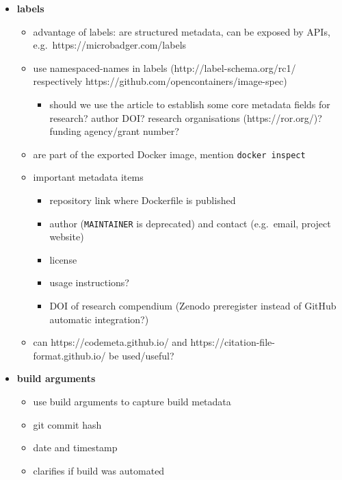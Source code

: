 \documentclass[10pt,letterpaper]{article}
\providecommand{\tightlist}{%
  \setlength{\itemsep}{0pt}\setlength{\parskip}{0pt}}
\begin{document}
\begin{itemize}
\tightlist
\item
  \textbf{labels}

  \begin{itemize}
  \tightlist
  \item
    advantage of labels: are structured metadata, can be exposed by
    APIs, e.g.~https://microbadger.com/labels
  \item
    use namespaced-names in labels (http://label-schema.org/rc1/
    respectively https://github.com/opencontainers/image-spec)

    \begin{itemize}
    \tightlist
    \item
      should we use the article to establish some core metadata fields
      for research? author DOI? research organisations
      (https://ror.org/)? funding agency/grant number?
    \end{itemize}
  \item
    are part of the exported Docker image, mention
    \texttt{docker\ inspect}
  \item
    important metadata items

    \begin{itemize}
    \tightlist
    \item
      repository link where Dockerfile is published
    \item
      author (\texttt{MAINTAINER} is deprecated) and contact
      (e.g.~email, project website)
    \item
      license
    \item
      usage instructions?
    \item
      DOI of research compendium (Zenodo preregister instead of GitHub
      automatic integration?)
    \end{itemize}
  \item
    can https://codemeta.github.io/ and
    https://citation-file-format.github.io/ be used/useful?
  \end{itemize}
\item
  \textbf{build arguments}

  \begin{itemize}
  \tightlist
  \item
    use build arguments to capture build metadata
  \item
    git commit hash
  \item
    date and timestamp
  \item
    clarifies if build was automated
  \end{itemize}
\end{itemize}
\end{document}
